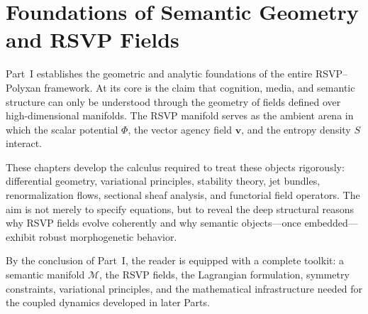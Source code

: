 \part{Foundations of Semantic Geometry and RSVP Fields}

Part~I establishes the geometric and analytic foundations of the entire
RSVP--Polyxan framework. At its core is the claim that cognition, media,
and semantic structure can only be understood through the geometry of
fields defined over high-dimensional manifolds. The RSVP manifold serves
as the ambient arena in which the scalar potential \( \Phi \), the vector
agency field \( \mathbf{v} \), and the entropy density \( S \) interact.

These chapters develop the calculus required to treat these objects
rigorously: differential geometry, variational principles, stability
theory, jet bundles, renormalization flows, sectional sheaf analysis,
and functorial field operators. The aim is not merely to specify
equations, but to reveal the deep structural reasons why RSVP fields
evolve coherently and why semantic objects---once embedded---exhibit
robust morphogenetic behavior.

By the conclusion of Part~I, the reader is equipped with a complete
toolkit: a semantic manifold \( \mathcal{M} \), the RSVP fields, the
Lagrangian formulation, symmetry constraints, variational principles,
and the mathematical infrastructure needed for the coupled dynamics
developed in later Parts.

\cleardoublepage
